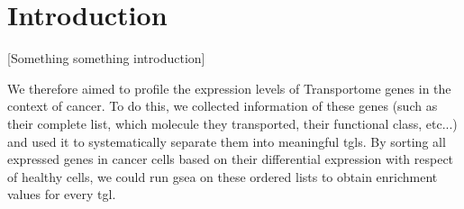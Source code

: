 \section{Introduction}

[Something something introduction]

We therefore aimed to profile the expression levels of Transportome genes in the context of cancer. To do this, we collected information of these genes (such as their complete list, which molecule they transported, their functional class, etc...) and used it to systematically separate them into meaningful \glspl{tgl}. By sorting all expressed genes in cancer cells based on their differential expression with %
respect of healthy cells, we could run \gls{gsea} on these ordered lists to obtain enrichment values for every \gls{tgl}.